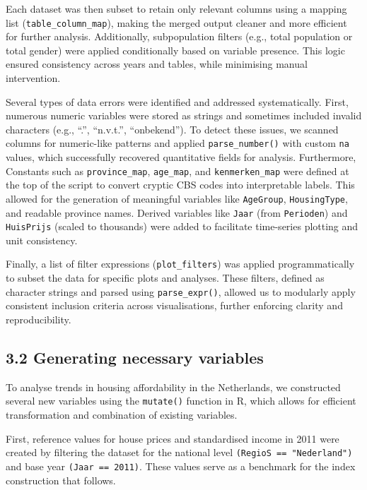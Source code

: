 \documentclass[
]{article}
\begin{document}
Each dataset was then subset to retain only relevant columns using a
mapping list (\texttt{table\_column\_map}), making the merged output
cleaner and more efficient for further analysis. Additionally,
subpopulation filters (e.g., total population or total gender) were
applied conditionally based on variable presence. This logic ensured
consistency across years and tables, while minimising manual
intervention.

Several types of data errors were identified and addressed
systematically. First, numerous numeric variables were stored as strings
and sometimes included invalid characters (e.g., ``.'', ``n.v.t.'',
``onbekend''). To detect these issues, we scanned columns for
numeric-like patterns and applied \texttt{parse\_number()} with custom
\texttt{na} values, which successfully recovered quantitative fields for
analysis. Furthermore, Constants such as \texttt{province\_map},
\texttt{age\_map}, and \texttt{kenmerken\_map} were defined at the top
of the script to convert cryptic CBS codes into interpretable labels.
This allowed for the generation of meaningful variables like
\texttt{AgeGroup}, \texttt{HousingType}, and readable province names.
Derived variables like \texttt{Jaar} (from \texttt{Perioden}) and
\texttt{HuisPrijs} (scaled to thousands) were added to facilitate
time-series plotting and unit consistency.

Finally, a list of filter expressions (\texttt{plot\_filters}) was
applied programmatically to subset the data for specific plots and
analyses. These filters, defined as character strings and parsed using
\texttt{parse\_expr()}, allowed us to modularly apply consistent
inclusion criteria across visualisations, further enforcing clarity and
reproducibility.

\subsection{3.2 Generating necessary
variables}\label{generating-necessary-variables}

To analyse trends in housing affordability in the Netherlands, we
constructed several new variables using the \texttt{mutate()} function
in R, which allows for efficient transformation and combination of
existing variables.

First, reference values for house prices and standardised income in 2011
were created by filtering the dataset for the national level
\texttt{(RegioS\ ==\ "Nederland")} and base year
\texttt{(Jaar\ ==\ 2011)}. These values serve as a benchmark for the
index construction that follows.
\end{document}

